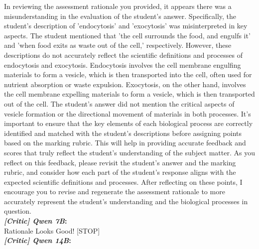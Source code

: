 \begin{figure*}
\begin{tcolorbox}[
    colback=gray!10,      %
    colframe=gray!80,     %
    title=Case Study 5,
    fonttitle=\bfseries,  %
    rounded corners,
    boxrule=0.5mm,        %
    width=\linewidth
]
In reviewing the assessment rationale you provided, it appears there was a misunderstanding in the evaluation of the student's answer. Specifically, the student's description of 'endocytosis' and 'exocytosis' was misinterpreted in key aspects. The student mentioned that 'the cell surrounds the food, and engulfs it' and 'when food exits as waste out of the cell,' respectively. However, these descriptions do not accurately reflect the scientific definitions and processes of endocytosis and exocytosis. Endocytosis involves the cell membrane engulfing materials to form a vesicle, which is then transported into the cell, often used for nutrient absorption or waste expulsion. Exocytosis, on the other hand, involves the cell membrane expelling materials to form a vesicle, which is then transported out of the cell. The student's answer did not mention the critical aspects of vesicle formation or the directional movement of materials in both processes. It's important to ensure that the key elements of each biological process are correctly identified and matched with the student's descriptions before assigning points based on the marking rubric. This will help in providing accurate feedback and scores that truly reflect the student's understanding of the subject matter. As you reflect on this feedback, please revisit the student's answer and the marking rubric, and consider how each part of the student's response aligns with the expected scientific definitions and processes. After reflecting on these points, I encourage you to revise and regenerate the assessment rationale to more accurately represent the student's understanding and the biological processes in question.\\
\textbf{\emph{[Critic] Qwen 7B}:}\\
Rationale Looks Good! [STOP]\\
\textbf{\emph{[Critic] Qwen 14B}:}\\

\end{tcolorbox}
\end{figure*}
